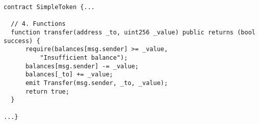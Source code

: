 \begin{lstlisting}[language=Solidity]
contract SimpleToken {...

  // 4. Functions
  function transfer(address _to, uint256 _value) public returns (bool success) {
      require(balances[msg.sender] >= _value, 
      	  "Insufficient balance");
      balances[msg.sender] -= _value;
      balances[_to] += _value;
      emit Transfer(msg.sender, _to, _value);
      return true;
  }
    
...}
\end{lstlisting}